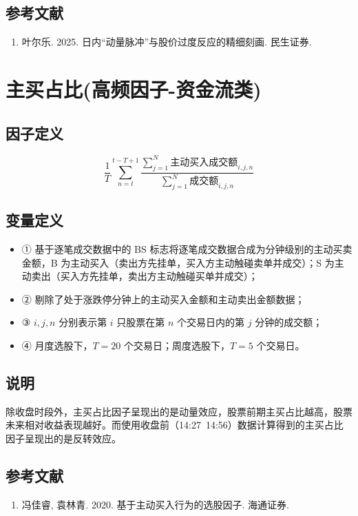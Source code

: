 \documentclass{article}
\begin{document}
\subsection{参考文献}
\begin{enumerate}
    \item 叶尔乐. 2025. 日内“动量脉冲”与股价过度反应的精细刻画. 民生证券.
\end{enumerate}

\section{主买占比(高频因子-资金流类)}

\subsection{因子定义}
\begin{equation}
    \frac{1}{T} \sum_{n=t}^{t-T+1} \frac{\sum_{j=1}^{N} \text{主动买入成交额}_{i,j,n}}{\sum_{j=1}^{N} \text{成交额}_{i,j,n}}
\end{equation}

\subsection{变量定义}
\begin{itemize}
    \item ① 基于逐笔成交数据中的 BS 标志将逐笔成交数据合成为分钟级别的主动买卖金额，B 为主动买入（卖出方先挂单，买入方主动触碰卖单并成交）；S 为主动卖出（买入方先挂单，卖出方主动触碰买单并成交）；
    \item ② 剔除了处于涨跌停分钟上的主动买入金额和主动卖出金额数据；
    \item ③ \( i, j, n \) 分别表示第 \( i \) 只股票在第 \( n \) 个交易日内的第 \( j \) 分钟的成交额；
    \item ④ 月度选股下，\( T = 20 \) 个交易日；周度选股下，\( T = 5 \) 个交易日。
\end{itemize}

\subsection{说明}
除收盘时段外，主买占比因子呈现出的是动量效应，股票前期主买占比越高，股票未来相对收益表现越好。而使用收盘前（14:27~14:56）数据计算得到的主买占比因子呈现出的是反转效应。

\subsection{参考文献}
\begin{enumerate}
    \item 冯佳睿, 袁林青. 2020. 基于主动买入行为的选股因子. 海通证券.
\end{enumerate}
\end{document}
